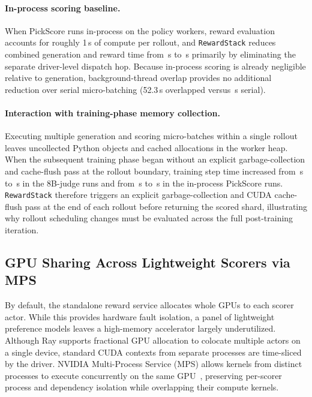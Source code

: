 \paragraph{In-process scoring baseline.}
When PickScore runs in-process on the policy workers, reward evaluation accounts for roughly 1\,s of compute per rollout, and \texttt{RewardStack} reduces combined generation and reward time from \RSLocalBase{}\,s to \RSLocalSerial{}\,s primarily by eliminating the separate driver-level dispatch hop.
Because in-process scoring is already negligible relative to generation, background-thread overlap provides no additional reduction over serial micro-batching (52.3\,s overlapped versus \RSLocalSerial{}\,s serial).

\paragraph{Interaction with training-phase memory collection.}
Executing multiple generation and scoring micro-batches within a single rollout leaves uncollected Python objects and cached allocations in the worker heap.
When the subsequent training phase began without an explicit garbage-collection and cache-flush pass at the rollout boundary, training step time increased from \RSTrainRemoteCollect{}\,s to \RSTrainRemoteNoCollect{}\,s in the 8B-judge runs and from \RSTrainLocalCollect{}\,s to \RSTrainLocalNoCollect{}\,s in the in-process PickScore runs.
\texttt{RewardStack} therefore triggers an explicit garbage-collection and CUDA cache-flush pass at the end of each rollout before returning the scored shard, illustrating why rollout scheduling changes must be evaluated across the full post-training iteration.

\subsection{GPU Sharing Across Lightweight Scorers via MPS}
\label{sec:reward-mps}

By default, the standalone reward service allocates whole GPUs to each scorer actor.
While this provides hardware fault isolation, a panel of lightweight preference models leaves a high-memory accelerator largely underutilized.
Although Ray supports fractional GPU allocation to colocate multiple actors on a single device, standard CUDA contexts from separate processes are time-sliced by the driver.
NVIDIA Multi-Process Service (MPS) allows kernels from distinct processes to execute concurrently on the same GPU~\citep{nvidiamps}, preserving per-scorer process and dependency isolation while overlapping their compute kernels.

